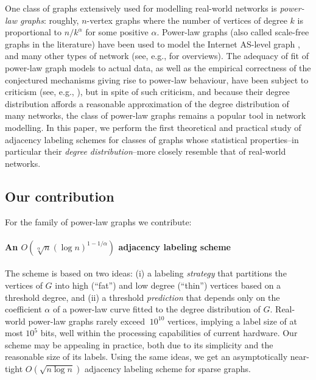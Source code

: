 One class of graphs extensively used for modelling real-world networks is \emph{power-law graphs}: roughly, $n$-vertex graphs where the number of vertices of degree $k$ is proportional to $n/k^{\alpha}$ for some positive $\alpha$. Power-law graphs (also called scale-free graphs in the literature) have been used to model the Internet AS-level graph \cite{DBLP:journals/ton/SiganosFFF03,DBLP:conf/podc/AkellaCKS03}, and many other types of network (see, e.g., \cite{mitzenmacher2004brief,clauset2009power} for overviews). 
The adequacy of fit of power-law graph models to actual data, as well as the empirical correctness of the conjectured mechanisms giving rise to power-law behaviour, have been subject to criticism (see, e.g., \cite{DBLP:journals/jacm/AchlioptasCKM09,clauset2009power}), but 
in spite of such criticism, and because their degree distribution affords a reasonable approximation of the degree distribution of many networks, the class of power-law graphs remains a popular tool in network modelling.
In this paper, we perform the first theoretical and practical study of adjacency labeling schemes for classes of graphs whose statistical properties--in particular their \emph{degree distribution}--more closely resemble that of real-world networks.


\subsection{Our contribution}
For the family of power-law graphs we contribute:
\paragraph{An  $O(\sqrt[\alpha] n (\log n)^{1 - 1/\alpha})$ adjacency labeling scheme}
The scheme is based on two ideas:
(i) a labeling \emph{strategy} that  partitions the vertices of $G$ into high (``fat'') and low degree (``thin'') vertices based on a threshold degree, and (ii) a threshold \emph{prediction} that depends only on the coefficient $\alpha$ of a power-law curve fitted to the degree distribution of $G$. 
Real-world power-law graphs rarely exceed  $~10^{10}$ vertices, implying a label size of at most  ${10^{5}}$ bits, well within the processing capabilities of current hardware. 
Our  scheme may be appealing in practice,  both due  to its simplicity and the reasonable size of its labels.
Using the same ideas, we get an  asymptotically near-tight  $O(\sqrt{n \log n})$ adjacency labeling scheme for sparse graphs.

